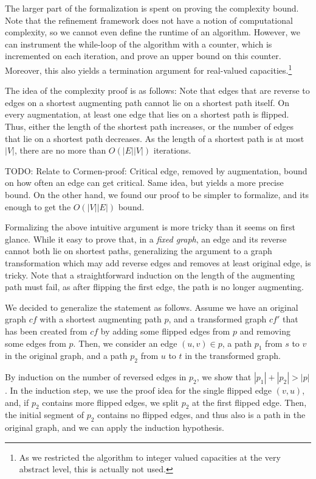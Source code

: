 \documentclass{llncs}
\begin{document}
  The larger part of the formalization is spent on proving the complexity bound. Note that the refinement framework does not 
  have a notion of computational complexity, so we cannot even define the runtime of an algorithm. However, we can instrument 
  the while-loop of the algorithm with a counter, which is incremented on each iteration, and prove an upper bound on this counter.
  Moreover, this also yields a termination argument for real-valued capacities.\footnote{As we restricted the algorithm 
  to integer valued capacities at the very abstract level, this is actually not used.}
  
  The idea of the complexity proof is as follows: Note that edges that are reverse to edges on a shortest augmenting path cannot lie 
  on a shortest path itself.
  On every augmentation, at least one edge that lies on a shortest path is flipped. Thus, either the length of the shortest path increases,
  or the number of edges that lie on a shortest path decreases. As the length of a shortest path is at most $|V|$, there are no more than $O(|E||V|)$ iterations.

  TODO: Relate to Cormen-proof: Critical edge, removed by augmentation, bound on how often an edge can get critical.  
    Same idea, but yields a more precise bound. On the other hand, we found our proof to be simpler to formalize, and its enough to
    get the $O(|V||E|)$ bound.
  
  Formalizing the above intuitive argument is more tricky than it seems on first glance. 
  While it easy to prove that, in a \emph{fixed graph}, an edge and its reverse cannot both lie on shortest paths, generalizing the argument
  to a graph transformation which may add reverse edges and removes at least original edge, is tricky. Note that a straightforward induction
  on the length of the augmenting path must fail, as after flipping the first edge, the path is no longer augmenting.
  
  We decided to generalize the statement as follows. Assume we have an original graph $cf$ with a shortest augmenting path $p$, and a transformed graph $cf'$ that has been created from
  $cf$ by adding some flipped edges from $p$ and removing some edges from $p$.
  Then, we consider an edge $(u,v) \in p$, a path $p_1$ from $s$ to $v$ in the original graph, and a path $p_2$ from $u$ to $t$ in the transformed graph.
  
  By induction on the number of reversed edges in $p_2$, we 
  show that $|p_1|+|p_2| > |p|$. In the induction step, we use the proof idea for the single flipped edge $(v,u)$, and,
  if $p_2$ contains more flipped edges, we split $p_2$ at the first flipped edge. Then, the initial segment of $p_2$ contains no flipped edges,
  and thus also is a path in the original graph, and we can apply the induction hypothesis.
  
\end{document}
